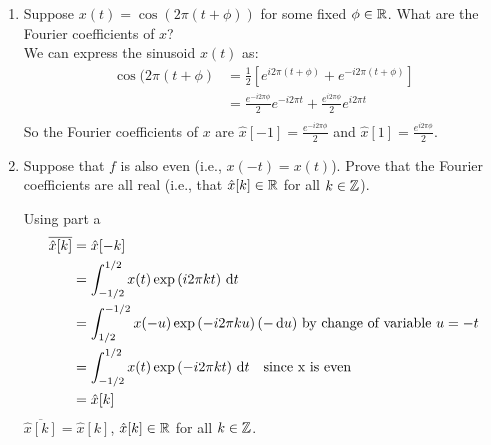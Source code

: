 \documentclass[12pt,twoside]{article}
\begin{document}
\begin{enumerate}
\begin{enumerate}
  \item Suppose $x(t)=\cos(2\pi(t+\phi))$ for some fixed
    $\phi\in\mathbb{R}$.  What are the Fourier coefficients of $x$?\\
    We can express the sinusoid $x(t)$ as:
  \begin{align*}   
  	\cos(2\pi(t+\phi) 	&= \frac{1}{2} [ e^{i 2 \pi (t+\phi)}  + e^{-i 2 \pi (t+\phi)} ] \\
					&=  \frac{e^{-i 2 \pi \phi}}{2} e^{-i 2 \pi t}  + \frac{e^{i 2 \pi \phi}}{2} e^{i 2 \pi t} \\
   \end{align*}
   So the Fourier coefficients of $x$ are $\hat{x}[-1] = \frac{e^{-i 2 \pi \phi}}{2}$ and $\hat{x}[1] = \frac{e^{i 2 \pi \phi}}{2}$.
       
  \item Suppose that $f$ is also even (i.e., $x(-t)=x(t)$).  Prove
    that the Fourier coefficients are all real (i.e., that
    $\hat{x}[k]\in\mathbb{R}$ for all $k\in\mathbb{Z}$).
    
    Using part a
      \begin{align*}
      	\overline{\hat{x}[k]}	&= 	\hat{x}[-k] \\
					&= 	\int_{-1/2}^{1/2} x(t) \exp \left( i 2 \pi k t \right)  \, \text{d}t \\
					&= 	\int_{1/2}^{-1/2} x(-u) \exp \left( - i 2 \pi k u \right)  (- \, \text{d}u)  \text{ by change of variable } u = -t \\
					&=	\int_{-1/2}^{1/2} x(t) \exp \left( - i 2 \pi k t \right)  \, \text{d}t \text{ ~ since x is even }\\
					&=	\hat{x}[k] \\
       \end{align*}  
       $\overline{\hat{x}[k]} = \hat{x}[k]$, $\hat{x}[k]  \in \mathbb{R}$ for all $k\in\mathbb{Z}$.
       
  \end{enumerate} 
   
 \end{enumerate}
\end{document}
